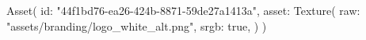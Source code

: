 Asset(
    id: "{44f1bd76-ea26-424b-8871-59de27a1413a}",
    asset: Texture(
        raw:  "assets/branding/logo_white_alt.png",
        srgb: true,
    )
)